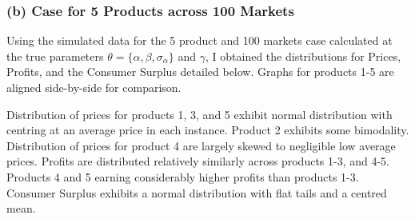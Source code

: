 \documentclass{article}
\begin{document}
\subsubsection{(b) Case for 5 Products across 100 Markets}
Using the simulated data for the 5 product and 100 markets case calculated at the true parameters $\theta=\{\alpha, \beta, \sigma_\alpha\}$ and $\gamma$, I obtained the distributions for Prices, Profits, and the Consumer Surplus detailed below. Graphs for products 1-5 are aligned side-by-side for comparison.
\par Distribution of prices for products 1, 3, and 5 exhibit normal distribution with centring at an average price in each instance. Product 2 exhibits some bimodality. Distribution of prices for product 4 are largely skewed to negligible low average prices. Profits are distributed relatively similarly across products 1-3, and 4-5. Products 4 and 5 earning considerably higher profits than products 1-3. Consumer Surplus exhibits a normal distribution with flat tails and a centred mean.
\end{document}
